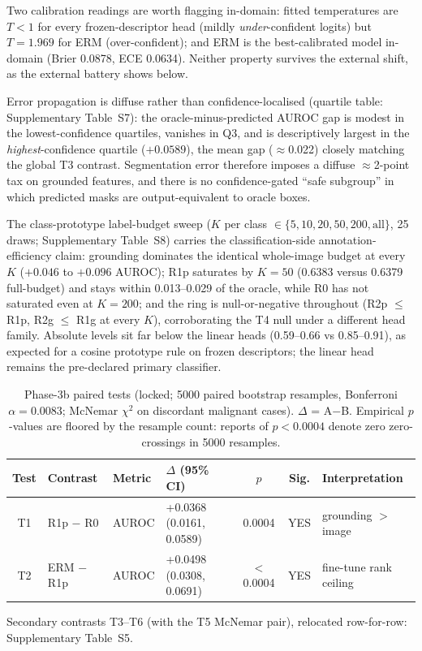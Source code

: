 \documentclass[jimh,article,submit,moreauthors,pdftex]{Definitions/tsp}
\begin{document}
Two calibration readings are worth flagging in-domain: fitted
temperatures are $T<1$ for every frozen-descriptor head (mildly
\emph{under}-confident logits) but $T=1.969$ for ERM
(over-confident); and ERM is the best-calibrated model in-domain
(Brier 0.0878, ECE 0.0634). Neither property survives the external
shift, as the external battery shows below.

Error propagation is diffuse rather than confidence-localised
(quartile table: Supplementary Table~S7): the oracle-minus-predicted
AUROC gap is modest in the lowest-confidence quartiles, vanishes in
Q3, and is descriptively largest in the \emph{highest}-confidence
quartile ($+0.0589$), the mean gap ($\approx$0.022) closely matching
the global T3 contrast. Segmentation error therefore imposes a diffuse
$\approx$2-point tax on grounded features, and there is no
confidence-gated ``safe subgroup'' in which predicted masks are
output-equivalent to oracle boxes.

The class-prototype label-budget sweep ($K$ per class
$\in \{5,10,20,50,200,\mathrm{all}\}$, 25 draws; Supplementary
Table~S8) carries the classification-side annotation-efficiency claim:
grounding dominates the identical whole-image budget at every $K$
($+0.046$ to $+0.096$ AUROC); R1p saturates by $K{=}50$ (0.6383 versus
0.6379 full-budget) and stays within 0.013--0.029 of the oracle, while
R0 has not saturated even at $K{=}200$; and the ring is
null-or-negative throughout (R2p $\leq$ R1p, R2g $\leq$ R1g at every
$K$), corroborating the T4 null under a different head family.
Absolute levels sit far below the linear heads (0.59--0.66 vs
0.85--0.91), as expected for a cosine prototype rule on frozen
descriptors; the linear head remains the pre-declared primary
classifier.

\begin{table}[!ht]
\centering\small
\caption{Phase-3b paired tests (locked; 5000 paired bootstrap resamples,
Bonferroni $\alpha = 0.0083$; McNemar $\chi^2$ on discordant malignant
cases). $\Delta$ = A$-$B. Empirical $p$-values are floored by the resample
count: reports of $p{<}0.0004$ denote zero zero-crossings in 5000 resamples.}
\label{tab:phase3b}
\begin{tabular}{clllccl}
\toprule
Test & Contrast & Metric & $\Delta$ (95\% CI) & $p$ & Sig. & Interpretation \\
\midrule
T1 & R1p $-$ R0  & AUROC & +0.0368 (0.0161, 0.0589) & 0.0004 & YES & grounding $>$ image \\
T2 & ERM $-$ R1p & AUROC & +0.0498 (0.0308, 0.0691) & $<$0.0004 & YES & fine-tune rank ceiling \\
\midrule
\end{tabular}

{\footnotesize Secondary contrasts T3--T6 (with the T5 McNemar pair), relocated row-for-row: Supplementary Table~S5.}
\end{table}
\end{document}
